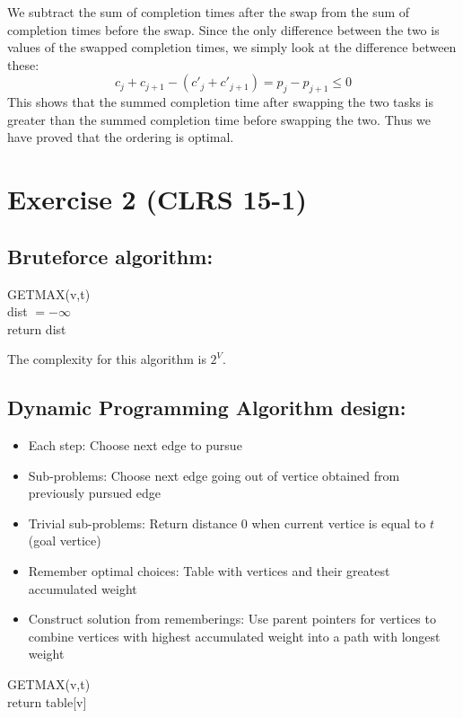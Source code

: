 We subtract the sum of completion times after the swap from the sum of completion times before the swap.
Since the only difference between the two is values of the swapped completion times, we simply look at the difference between these:
$$c_j + c_{j+1} - (c'_j + c'_{j+1})= p_j - p_{j + 1} \leq 0$$
This shows that the summed completion time after swapping the two tasks is greater than the summed completion time before swapping the two.
Thus we have proved that the ordering is optimal.

\section*{Exercise 2 (CLRS 15-1)}

\subsection*{Bruteforce algorithm:}

\begin{algorithm}[H]
GETMAX(v,t)
\\
dist $= -\infty$\\
return dist
\end{algorithm}
The complexity for this algorithm is $2^V$.

\subsection*{Dynamic Programming Algorithm design:}

\begin{itemize}
\item{Each step: Choose next edge to pursue}
\item{Sub-problems: Choose next edge going out of vertice obtained from previously pursued edge}
\item{Trivial sub-problems: Return distance 0 when current vertice is equal to $t$ (goal vertice)}
\item{Remember optimal choices: Table with vertices and their greatest accumulated weight}
\item{Construct solution from rememberings: Use parent pointers for vertices to combine vertices with highest accumulated weight into a path with longest weight}
\end{itemize}

\begin{algorithm}[H]
GETMAX(v,t)\\
return table[v]
\end{algorithm}

